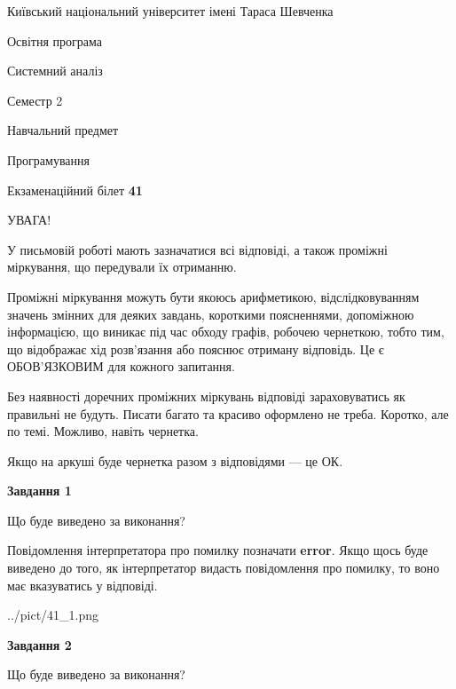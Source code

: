 \documentclass[12pt, ukrainian]{article}
\begin{document}
{{\begin {small}\par
{ \center  Київський національний університет імені Тараса Шевченка \par}
{\parbox {5 cm}{Освітня програма \hfill}{\parbox {7 cm}{Системний аналіз \hfill}}\parbox {6 cm}{\hfill Семестр 2}}\par
{\parbox {5 cm} {Навчальний предмет \hfill}\parbox {7 cm}{Програмування \hfill}\parbox {6cm}{\hfill}\par}\vspace{-7pt} \end{small}}{\center Екзаменаційний білет \No \textbf
{ 41 }\par}}
{
\begin {large}
УВАГА!

У письмовій роботі мають зазначатися всі відповіді, а також проміжні міркування, що передували їх отриманню.

Проміжні міркування можуть бути якоюсь арифметикою, відслідковуванням зна\-чень змінних для деяких завдань,
короткими поясненнями, допоміжною інформацією, що виникає під час обходу графів, робочею чернеткою,
тобто тим, що відображає хід розв’язання або пояснює отриману відповідь.
Це є ОБОВ’ЯЗКОВИМ для кожного запитання.

Без наявності доречних проміжних міркувань відповіді зараховуватись як правиль\-ні не будуть.
Писати багато та красиво оформлено не треба. Коротко, але по темі. Можли\-во, навіть чернетка.

Якщо на аркуші буде чернетка разом з відповідями --- це ОК.

\newpage

{\begin {center}\textbf{Завдання 1}\end {center}}\par
Що буде виведено за виконання?

Повідомлення інтерпретатора про помилку позначати \textbf{error}.
Якщо щось буде виведено до того, як інтерпретатор видасть повідомлення про помилку, 
то воно має вказуватись у відповіді. \par


\begin{center}
	{../pict/41_1.png}
\end{center}
\newpage

{\begin {center}\textbf{Завдання 2}\end {center}}\par
Що буде виведено за виконання?


\end{large}}
\end{document}
